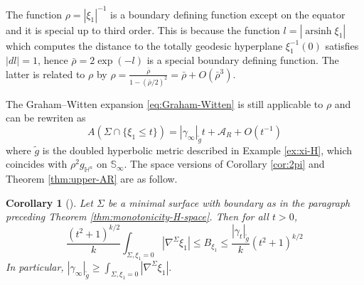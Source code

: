 \documentclass[11pt]{article}
\newtheorem{corollary}[theorem]{Corollary}
\DeclareMathOperator\arsinh{arsinh}
\begin{document}
The function \(\rho = |\xi_1|^{-1}\) is a boundary defining function except on the
equator and it is special up to third order. This is because the
function \(l=|\arsinh\xi_1|\) which computes the distance to the totally geodesic hyperplane \(\xi_1^{-1}(0)\)
satisfies \(|dl|=1\), hence \(\bar\rho = 2\exp(-l)\) is a special boundary defining
function. The latter is related to \(\rho\) by \(\rho = \frac{\bar\rho}{1 - (\bar\rho/2)^2}
= \bar\rho + O(\bar\rho^3)\). 

The Graham--Witten expansion \eqref{eq:Graham-Witten} is still applicable to \(\rho\) and can be rewriten as
\begin{equation}
\label{eq:Graham-Witten-space}
A(\Sigma\cap \{ \xi_1 \leq t\}) = |\gamma_\infty|_{\tilde g} t + \mathcal{A}_R + O(t^{-1})	
\end{equation}
where \(\tilde g\) is the
doubled hyperbolic metric described in Example \ref{ex:xi-H},
which coincides with \(\rho^2g_{\mathbb{H}^n}\) on \(\mathbb{S}_\infty\). The
space versions of Corollary \ref{cor:2pi} and Theorem \ref{thm:upper-AR} are as follow.

\begin{corollary}[]
\label{cor:2pi-space}
Let \(\Sigma\) be a minimal surface with boundary as in the paragraph preceding Theorem \ref{thm:monotonicity-H-space}. Then for all \(t > 0\),
   \[
   \frac{(t^2+1)^{k/2}}{k}\int_{\Sigma,\xi_1 = 0}|\nabla^\Sigma\xi_1| \leq B_{\xi_1} \leq \frac{|\gamma_t|_{\tilde g}}{k} (t^2+1)^{k/2}
   \]
In particular,
\(\left|\gamma_\infty\right|_{\tilde g} \geq \int_{\Sigma,\xi_1 = 0}|\nabla^\Sigma\xi_1|.\)
\end{corollary}
\end{document}
